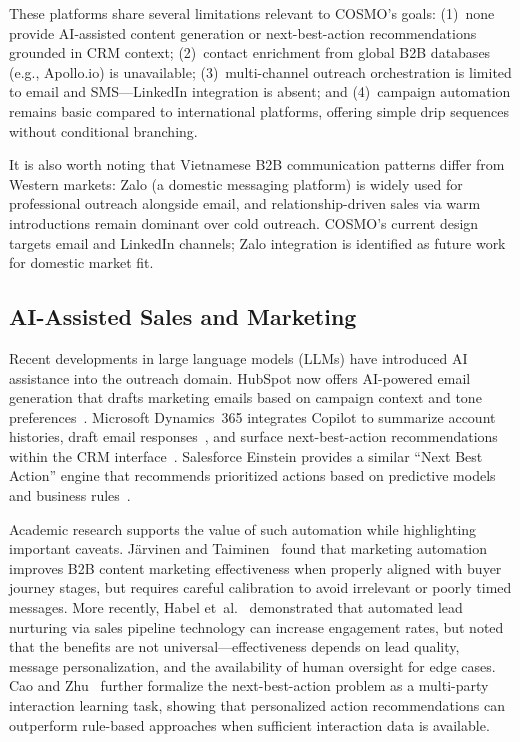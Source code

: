 \documentclass[a4paper]{article}
\begin{document}
These platforms share several limitations relevant to COSMO's goals: 
(1)~none provide AI-assisted content generation or next-best-action 
recommendations grounded in CRM context; (2)~contact enrichment from 
global B2B databases (e.g., Apollo.io) is unavailable; (3)~multi-channel 
outreach orchestration is limited to email and SMS---LinkedIn 
integration is absent; and (4)~campaign automation remains basic 
compared to international platforms, offering simple drip sequences 
without conditional branching.

It is also worth noting that Vietnamese B2B communication patterns 
differ from Western markets: Zalo (a domestic messaging platform) 
is widely used for professional outreach alongside email, and 
relationship-driven sales via warm introductions remain dominant 
over cold outreach. COSMO's current design targets email and LinkedIn 
channels; Zalo integration is identified as future work for domestic 
market fit.

\subsection{AI-Assisted Sales and Marketing}

Recent developments in large language models (LLMs) have introduced 
AI assistance into the outreach domain. HubSpot now offers AI-powered 
email generation that drafts marketing emails based on campaign context 
and tone preferences~\cite{hubspot_ai_email_creation}. Microsoft 
Dynamics~365 integrates Copilot to summarize account histories, draft 
email responses~\cite{ms_copilot_email_draft}, and surface 
next-best-action recommendations within the CRM 
interface~\cite{ms_d365_copilot_overview}. Salesforce Einstein provides 
a similar ``Next Best Action'' engine that recommends prioritized 
actions based on predictive models and business 
rules~\cite{salesforce_nba_about, salesforce_nba_get_started}.

Academic research supports the value of such automation while 
highlighting important caveats. J\"{a}rvinen and 
Taiminen~\cite{jarvinen2016marketingautomation} found that marketing 
automation improves B2B content marketing effectiveness when properly 
aligned with buyer journey stages, but requires careful calibration 
to avoid irrelevant or poorly timed messages. More recently, Habel 
et~al.~\cite{habel2025aln} demonstrated that automated lead nurturing 
via sales pipeline technology can increase engagement rates, but noted 
that the benefits are not universal---effectiveness depends on lead 
quality, message personalization, and the availability of human 
oversight for edge cases. Cao and Zhu~\cite{cao2022nba} further 
formalize the next-best-action problem as a multi-party interaction 
learning task, showing that personalized action recommendations can 
outperform rule-based approaches when sufficient interaction data is 
available.
\end{document}

